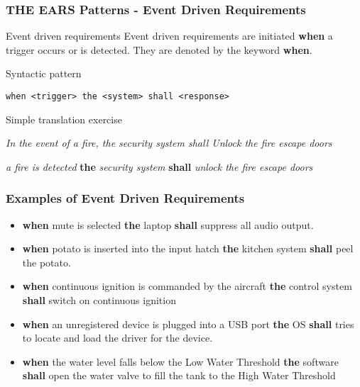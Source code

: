 \documentclass[aspectratio=169]{beamer}
\newcommand{\earse}[3]{{\bf \color{mygreen}when} {#1} {\bf \color{mypurple}the} {#2} {\bf \color{mypurple}shall} {#3}}
\begin{document}
\begin{frame}[fragile]
 \frametitle{THE EARS Patterns - Event Driven Requirements}
 \begin{block}{Event driven requirements}
  Event driven requirements are initiated {\bf when} %
  a trigger occurs or is detected. They are denoted  by the keyword {\bf \color{mygreen} when}.
 \end{block}
 \begin{block}{Syntactic pattern}
  \begin{lstlisting}[language=EARS]
             when <trigger> the <system> shall <response>
  \end{lstlisting}
 \end{block}
  \pause
   \begin{block}{Simple translation exercise}
   \begin{description}
   \pause
     \item [Original req:] \textit{In the event of a fire, the security system shall Unlock the fire escape doors}
     \item [In EARS:] \pause \earse{\textit{a fire is detected}}{\textit{security system}}{\textit{unlock the fire escape doors}}
   \end{description}
   \end{block}
\end{frame}  
%
\begin{frame}
  \frametitle{Examples of Event Driven Requirements}
   \begin{example}
   \begin{itemize}
     \item \earse{mute is selected}{laptop}{suppress all audio output}.
     \item \earse{potato is inserted into the input hatch}{kitchen system}{peel the potato}.
     \item \earse{continuous ignition is commanded by the aircraft}{control system}{switch on
continuous ignition}
     \item \earse{an unregistered device is plugged into a USB port}{OS}{tries to locate and load the driver for the device.}
     \item \earse{the water level falls below the Low Water Threshold}{software}{open the water valve
to fill the tank to the High Water Threshold}
   \end{itemize}
   \end{example}
\end{frame}
%
\end{document}
